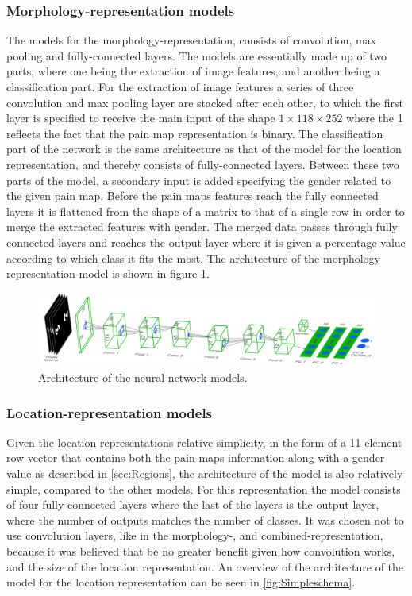 \subsubsection{Morphology-representation models}
The models for the morphology-representation, consists of convolution, max pooling and fully-connected layers.  
The models are essentially made up of two parts, where one being the extraction of image features, and another being a classification part. 
For the extraction of image features a series of three convolution and max pooling layer are stacked after each other, to which the first layer is specified to receive the main input of the shape $1 \times 118 \times 252$ where the 1 reflects the fact that the pain map representation is binary. 
The classification part of the network is the same architecture as that of the model for the location representation, and thereby consists of fully-connected layers. Between these two parts of the model, a secondary input is added specifying the gender related to the given pain map. 
Before the pain maps features reach the fully connected layers it is flattened from the shape of a matrix to that of a single row in order to merge the extracted features with gender. The merged data passes through fully connected layers and reaches the output layer where it is given a percentage value according to which class it fits the most. 
The architecture of the morphology representation model is shown in figure \ref{fig:Schema1}.

\begin{figure} [H]
\centering
\includegraphics[width=1.0\textwidth]{figures/models}
\caption{Architecture of the neural network models.}
\label{fig:Schema1} 
\end{figure}


\subsubsection{Location-representation models}
Given the location representations relative simplicity, in the form of a 11 element row-vector that contains both the pain maps information along with a gender value as described in \ref{sec:Regions}, the architecture of the model is also relatively simple, compared to the other models.  
For this representation the model consists of four fully-connected layers where the last of the layers is the output layer, where the number of outputs matches the number of classes. 
It was chosen not to use convolution layers, like in the morphology-, and combined-representation, because it was believed that be no greater benefit given how convolution works, and the size of the location representation. 
An overview of the architecture of the model for the location representation can be seen in \ref{fig:Simpleschema}.


